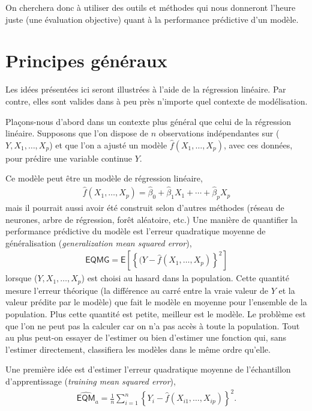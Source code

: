 \documentclass[
  11pt,
  letterpaper,
]{book}
\theoremstyle{definition}
\theoremstyle{definition}
\theoremstyle{definition}
\theoremstyle{definition}
\theoremstyle{remark}
\begin{document}
On cherchera donc à utiliser des outils et méthodes qui nous donneront l'heure juste (une évaluation objective) quant à la performance prédictive d'un modèle.

\hypertarget{principes-guxe9nuxe9raux}{%
\section{Principes généraux}\label{principes-guxe9nuxe9raux}}

Les idées présentées ici seront illustrées à l'aide de la régression linéaire. Par contre, elles sont valides dans à peu près n'importe quel contexte de modélisation.

Plaçons-nous d'abord dans un contexte plus général que celui de la régression linéaire. Supposons que l'on dispose de \(n\) observations indépendantes sur (\(Y, X_1, \ldots, X_p\)) et que l'on a ajusté un modèle \(\widehat{f}(X_1, \ldots, X_p)\), avec ces données, pour prédire une variable continue \(Y\).

Ce modèle peut être un modèle de régression linéaire,
\begin{align*}
\widehat{f}(X_1, \ldots, X_p) = \widehat{\beta}_0 + \widehat{\beta}_1X_1 + \cdots + \widehat{\beta}_pX_p
\end{align*}
mais il pourrait aussi avoir été construit selon d'autres méthodes (réseau de neurones, arbre de régression, forêt aléatoire, etc.) Une manière de quantifier la performance prédictive du modèle est l'erreur quadratique moyenne de généralisation (\emph{generalization mean squared error}),
\begin{align*}
\mathsf{EQMG}=\mathsf{E}\left[\left\{(Y-\widehat{f}(X_1, \ldots, X_p)\right\}^2\right]
\end{align*}
lorsque (\(Y, X_1, \ldots, X_p\)) est choisi au hasard dans la population. Cette quantité mesure l'erreur théorique (la différence au carré entre la vraie valeur de \(Y\) et la valeur prédite par le modèle) que fait le modèle en moyenne pour l'ensemble de la population. Plus cette quantité est petite, meilleur est le modèle. Le problème est que l'on ne peut pas la calculer car on n'a pas accès à toute la population. Tout au plus peut-on essayer de l'estimer ou bien d'estimer une fonction qui, sans l'estimer directement, classifiera les modèles dans le même ordre qu'elle.

Une première idée est d'estimer l'erreur quadratique moyenne de l'échantillon d'apprentissage (\emph{training mean squared error}),
\begin{align*}
\widehat{\mathsf{EQM}}_a= \frac{1}{n}\sum_{i=1}^n \left\{Y_i-\widehat{f}(X_{i1}, \ldots, X_{ip})\right\}^2.
\end{align*}
\end{document}
